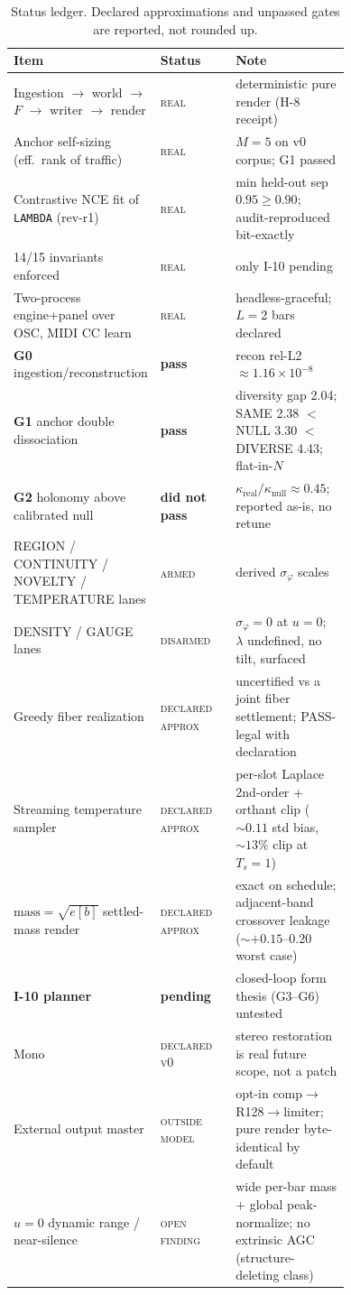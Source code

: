 \documentclass[11pt]{article}
\newcommand{\code}[1]{\texttt{\small #1}}
\begin{document}
\begin{table}[htbp]
\centering
\caption{Status ledger. Declared approximations and unpassed gates are reported,
not rounded up.}
\label{tab:status}
\small
\renewcommand{\arraystretch}{1.15}
\begin{tabular}{@{}p{0.40\linewidth} l p{0.34\linewidth}@{}}
\toprule
Item & Status & Note \\
\midrule
Ingestion $\rightarrow$ world $\rightarrow$ $F$ $\rightarrow$ writer $\rightarrow$ render
  & \textsc{real} & deterministic pure render (H-8 receipt) \\
Anchor self-sizing (eff.\ rank of traffic) & \textsc{real} & $M=5$ on v0 corpus; G1 passed \\
Contrastive NCE fit of \code{LAMBDA} (rev-r1) & \textsc{real} & min held-out sep $0.95\ge0.90$; audit-reproduced bit-exactly \\
14/15 invariants enforced & \textsc{real} & only I-10 pending \\
Two-process engine+panel over OSC, MIDI CC learn & \textsc{real} & headless-graceful; $L=2$ bars declared \\
\textbf{G0} ingestion/reconstruction & \textbf{pass} & recon rel-L2 $\approx 1.16\!\times\!10^{-8}$ \\
\textbf{G1} anchor double dissociation & \textbf{pass} & diversity gap 2.04; SAME 2.38 $<$ NULL 3.30 $<$ DIVERSE 4.43; flat-in-$N$ \\
\textbf{G2} holonomy above calibrated null & \textbf{did not pass} & $\kappa_{\text{real}}/\kappa_{\text{null}}\approx0.45$; reported as-is, no retune \\
REGION / CONTINUITY / NOVELTY / TEMPERATURE lanes & \textsc{armed} & derived $\sigma_\varphi$ scales \\
DENSITY / GAUGE lanes & \textsc{disarmed} & $\sigma_\varphi=0$ at $u{=}0$; $\lambda$ undefined, no tilt, surfaced \\
Greedy fiber realization & \textsc{declared approx} & uncertified vs a joint fiber settlement; PASS-legal with declaration \\
Streaming temperature sampler & \textsc{declared approx} & per-slot Laplace 2nd-order + orthant clip ($\sim0.11$ std bias, $\sim13\%$ clip at $T_s{=}1$) \\
$\text{mass}=\sqrt{e[b]}$ settled-mass render & \textsc{declared approx} & exact on schedule; adjacent-band crossover leakage ($\sim{+}0.15$--$0.20$ worst case) \\
\textbf{I-10 planner} & \textbf{pending} & closed-loop form thesis (G3--G6) untested \\
Mono & \textsc{declared v0} & stereo restoration is real future scope, not a patch \\
External output master & \textsc{outside model} & opt-in comp$\rightarrow$R128$\rightarrow$limiter; pure render byte-identical by default \\
$u{=}0$ dynamic range / near-silence & \textsc{open finding} & wide per-bar mass $+$ global peak-normalize; no extrinsic AGC (structure-deleting class) \\
\bottomrule
\end{tabular}
\end{table}
\end{document}
